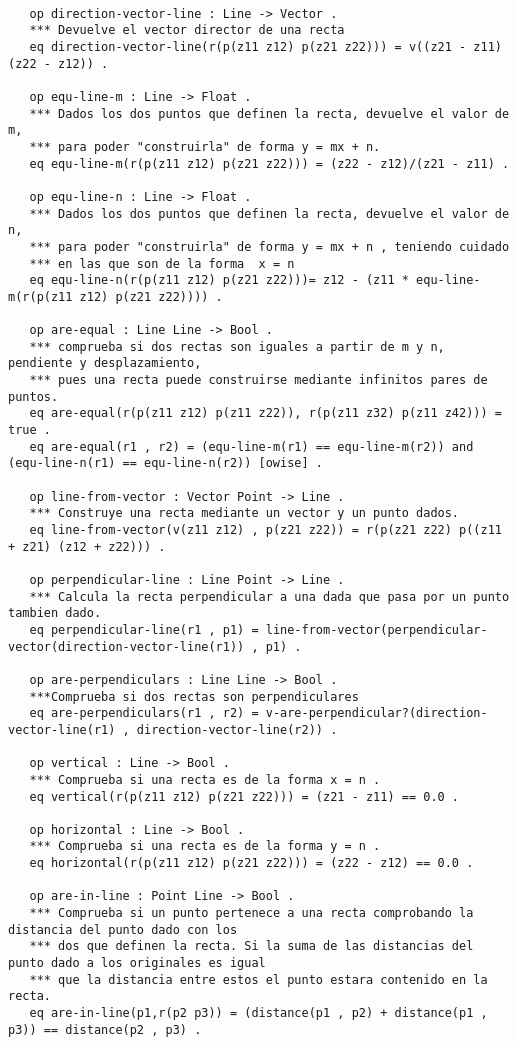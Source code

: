 \documentclass[12pt,a4paper]{book}
\begin{document}
\begin{verbatim}

   op direction-vector-line : Line -> Vector .
   *** Devuelve el vector director de una recta
   eq direction-vector-line(r(p(z11 z12) p(z21 z22))) = v((z21 - z11) (z22 - z12)) .

   op equ-line-m : Line -> Float .
   *** Dados los dos puntos que definen la recta, devuelve el valor de m, 
   *** para poder "construirla" de forma y = mx + n.
   eq equ-line-m(r(p(z11 z12) p(z21 z22))) = (z22 - z12)/(z21 - z11) .

   op equ-line-n : Line -> Float .
   *** Dados los dos puntos que definen la recta, devuelve el valor de n, 
   *** para poder "construirla" de forma y = mx + n , teniendo cuidado 
   *** en las que son de la forma  x = n
   eq equ-line-n(r(p(z11 z12) p(z21 z22)))= z12 - (z11 * equ-line-m(r(p(z11 z12) p(z21 z22)))) .

   op are-equal : Line Line -> Bool .
   *** comprueba si dos rectas son iguales a partir de m y n, pendiente y desplazamiento, 
   *** pues una recta puede construirse mediante infinitos pares de puntos.
   eq are-equal(r(p(z11 z12) p(z11 z22)), r(p(z11 z32) p(z11 z42))) = true . 
   eq are-equal(r1 , r2) = (equ-line-m(r1) == equ-line-m(r2)) and (equ-line-n(r1) == equ-line-n(r2)) [owise] .

   op line-from-vector : Vector Point -> Line .
   *** Construye una recta mediante un vector y un punto dados.
   eq line-from-vector(v(z11 z12) , p(z21 z22)) = r(p(z21 z22) p((z11 + z21) (z12 + z22))) .

   op perpendicular-line : Line Point -> Line .
   *** Calcula la recta perpendicular a una dada que pasa por un punto tambien dado.	
   eq perpendicular-line(r1 , p1) = line-from-vector(perpendicular-vector(direction-vector-line(r1)) , p1) .

   op are-perpendiculars : Line Line -> Bool .
   ***Comprueba si dos rectas son perpendiculares
   eq are-perpendiculars(r1 , r2) = v-are-perpendicular?(direction-vector-line(r1) , direction-vector-line(r2)) .

   op vertical : Line -> Bool .
   *** Comprueba si una recta es de la forma x = n .
   eq vertical(r(p(z11 z12) p(z21 z22))) = (z21 - z11) == 0.0 .

   op horizontal : Line -> Bool .
   *** Comprueba si una recta es de la forma y = n .
   eq horizontal(r(p(z11 z12) p(z21 z22))) = (z22 - z12) == 0.0 .
	
   op are-in-line : Point Line -> Bool .
   *** Comprueba si un punto pertenece a una recta comprobando la distancia del punto dado con los
   *** dos que definen la recta. Si la suma de las distancias del punto dado a los originales es igual 
   *** que la distancia entre estos el punto estara contenido en la recta.
   eq are-in-line(p1,r(p2 p3)) = (distance(p1 , p2) + distance(p1 , p3)) == distance(p2 , p3) . 

\end{verbatim}
\end{document}
